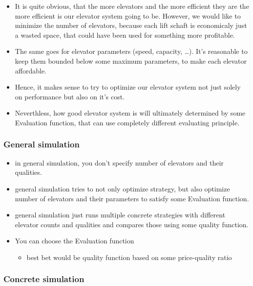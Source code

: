 \begin{itemize}
\item
  It is quite obvious, that the more elevators and the more efficient
  they are the more efficient is our elevator system going to be.
  However, we would like to minimize the number of elevators, because
  each lift schaft is economicaly just a wasted space, that could have
  been used for something more profitable.
\item
  The same goes for elevator parameters (speed, capacity, \ldots{}).
  It's reasonable to keep them bounded below some maximum parameters, to
  make each elevator affordable.
\item
  Hence, it makes sense to try to optimize our elevator system not just
  solely on performance but also on it's cost.
\item
  Neverthless, how good elevator system is will ultimately determined by
  some Evaluation function, that can use completely different evaluating
  principle.
\end{itemize}

\hypertarget{general-simulation}{%
\subsubsection{General simulation}\label{general-simulation}}

\begin{itemize}
\item
  in general simulation, you don't specify number of elevators and their
  qualities.
\item
  general simulation tries to not only optimize strategy, but also
  optimize number of elevators and their parameters to satisfy some
  Evaluation function.
\item
  general simulation just runs multiple concrete strategies with
  different elevator counts and qualities and compares those using some
  quality function.
\item
  You can choose the Evaluation function

  \begin{itemize}
  \tightlist
  \item
    best bet would be quality function based on some price-quality ratio
  \end{itemize}
\end{itemize}

\hypertarget{concrete-simulation}{%
\subsubsection{Concrete simulation}\label{concrete-simulation}}

